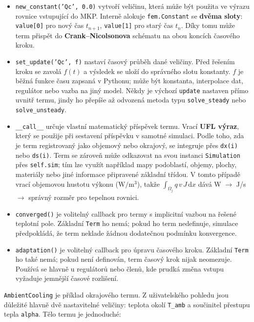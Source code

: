 \documentclass[a4paper,11pt]{article}
\begin{document}
\begin{itemize}
  \item \texttt{new\_constant('Qc', 0.0)} vytvoří veličinu, která může být použita
        ve výrazu rovnice vstupující do MKP. Interně alokuje \texttt{fem.Constant}
        se \textbf{dvěma sloty}: \texttt{value[0]} pro nový čas
        \(t_{n+1}\), \texttt{value[1]} pro starý čas \(t_n\). Díky tomu může
        term přispět do \textbf{Crank--Nicolsonova} schématu na obou koncích
        časového kroku.
  \item \texttt{set\_update('Qc', f)} nastaví časový průběh dané veličiny.
        Před řešením kroku se zavolá \(f(t)\) a výsledek se uloží do správného
        slotu konstanty. \(f\) je běžná funkce času zapsaná v Pythonu; může být
        konstanta, interpolace dat, regulátor nebo vazba na jiný model. Někdy je
        výchozí \texttt{update} nastaven přímo uvnitř termu, jindy ho přepíše až
        odvozená metoda typu \texttt{solve\_steady} nebo \texttt{solve\_unsteady}.
  \item \texttt{\_\_call\_\_} určuje vlastní matematický příspěvek termu. Vrací
        \textbf{UFL výraz}, který se použije při sestavení příspěvku v samotné
        simulaci. Podle toho, zda je term registrovaný jako objemový nebo
        okrajový, se integruje přes \texttt{dx(i)} nebo \texttt{ds(i)}. Term se
        zároveň může odkazovat na svou instanci \texttt{Simulation} přes
        \texttt{self.sim}; tím lze využít například mapy podoblastí, objemy,
        plochy, materiály nebo jiné informace připravené základní třídou.
        V tomto případě vrací objemovou hustotu výkonu (\(\mathrm{W/m^3}\)), takže
        \(\int_{\Omega_j} q\,v\,J\,\mathrm{d}x\) dává W $\to$ J/s $\to$
        správný rozměr pro tepelnou rovnici.
  \item \texttt{converged()} je volitelný callback pro termy s implicitní vazbou
        na řešené teplotní pole. Základní \texttt{Term} ho nemá; pokud ho term
        nedefinuje, simulace předpokládá, že term neklade žádnou dodatečnou
        podmínku konvergence.
  \item \texttt{adaptation()} je volitelný callback pro úpravu časového kroku.
        Základní \texttt{Term} ho také nemá; pokud není definován, term časový
        krok nijak neomezuje. Používá se hlavně u regulátorů nebo členů, kde
        prudká změna vstupu vyžaduje jemnější časové rozlišení.
\end{itemize}

\texttt{AmbientCooling} je příklad okrajového termu. Z uživatelského pohledu
jsou důležité hlavně dvě nastavitelné veličiny: teplota okolí \texttt{T\_amb} a
součinitel přestupu tepla \texttt{alpha}. Tělo termu je jednoduché:
\end{document}
